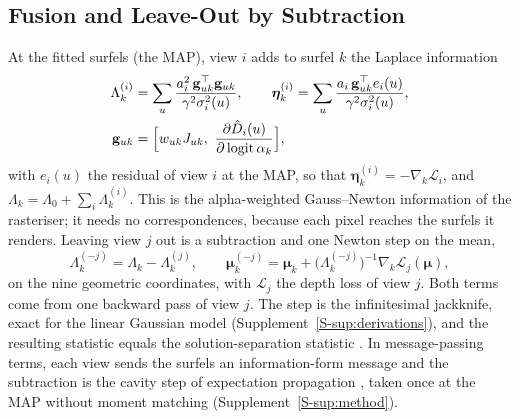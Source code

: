 \subsection{Fusion and Leave-Out by Subtraction}
\label{sec:method:fusion}
At the fitted surfels (the MAP), view $i$ adds to surfel $k$ the Laplace information
\begin{equation}
\begin{split}
  \Lambda_{k}^{(i)}&=\sum_{u}\frac{a_i^{2}\,\mathbf{g}_{uk}^{\top}\mathbf{g}_{uk}}{\gamma^{2}\sigma_{i}^{2}(u)},\qquad
  \boldsymbol\eta_{k}^{(i)}=\sum_{u}\frac{a_i\,\mathbf{g}_{uk}^{\top}e_i(u)}{\gamma^{2}\sigma_{i}^{2}(u)},\\
  \mathbf{g}_{uk}&=\Bigl[w_{uk}J_{uk},\ \frac{\partial\hat D_i(u)}{\partial\,\mathrm{logit}\,\alpha_k}\Bigr],
\end{split}
  \label{eq:info}
\end{equation}
with $e_i(u)$ the residual of view $i$ at the MAP, so that $\boldsymbol\eta_k^{(i)}=-\nabla_k\mathcal{L}_i$,
and $\Lambda_k=\Lambda_0+\sum_i\Lambda_k^{(i)}$. This is the alpha-weighted Gauss--Newton information of the
rasteriser; it needs no correspondences, because each pixel reaches the surfels it renders. Leaving view
$j$ out is a subtraction and one Newton step on the mean,
\begin{equation}
  \Lambda_{k}^{(-j)}=\Lambda_k-\Lambda_k^{(j)},\qquad
  \boldsymbol\mu_{k}^{(-j)}=\boldsymbol\mu_k+\bigl(\Lambda_{k}^{(-j)}\bigr)^{-1}\nabla_{k}\mathcal{L}_j(\boldsymbol\mu),
  \label{eq:loo}
\end{equation}
on the nine geometric coordinates, with $\mathcal{L}_j$ the depth loss of view $j$. Both terms come from one
backward pass of view $j$. The step is the infinitesimal jackknife, exact for the linear Gaussian model
(Supplement~\ref{S-sup:derivations}), and the resulting statistic equals the solution-separation statistic
\cite{flt_raim_joerger}. In message-passing terms, each view sends the surfels an information-form message
and the subtraction is the cavity step of expectation propagation \cite{mp_minka_ep}, taken once at the
MAP without moment matching (Supplement~\ref{S-sup:method}).

